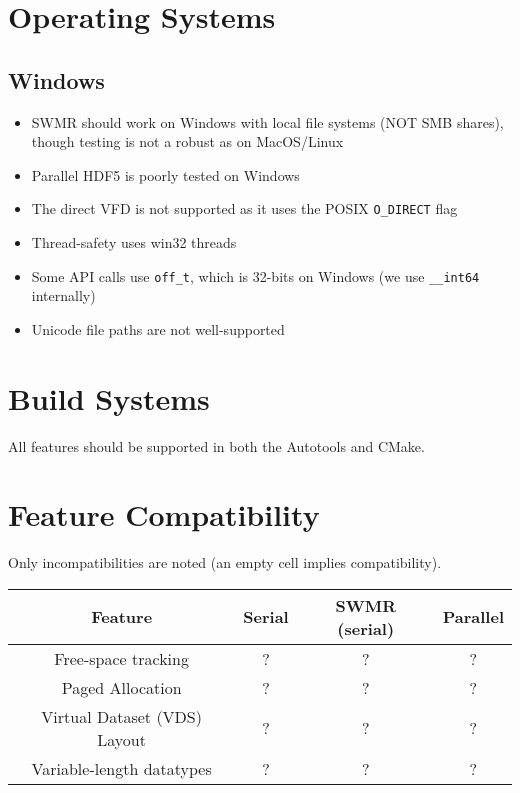 
\section{Operating Systems}

\subsection{Windows}
\begin{itemize}
    \item SWMR should work on Windows with local file systems (NOT SMB shares), though testing is not a robust as on MacOS/Linux
    \item Parallel HDF5 is poorly tested on Windows
    \item The direct VFD is not supported as it uses the POSIX \texttt{O\_DIRECT} flag
    \item Thread-safety uses win32 threads
    \item Some API calls use \texttt{off\_t}, which is 32-bits on Windows (we use \texttt{\_\_int64} internally)
    \item Unicode file paths are not well-supported
\end{itemize}

\section{Build Systems}

All features should be supported in both the Autotools and CMake.

\section{Feature Compatibility}

Only incompatibilities are noted (an empty cell implies compatibility).

\begin{minipage}{\textwidth}
  \begin{center}
    \begin{tabular}{|| c | c | c | c ||}
      \hline
      Feature & Serial & SWMR (serial) & Parallel \\
      \hline
      Free-space tracking & ? & ? & ?\\
      \hline
      Paged Allocation & ? & ? & ? \\
      \hline

      Virtual Dataset (VDS) Layout & ? & ? & ? \\
      \hline
      Variable-length datatypes & ? & ? & ? \\
      \hline
    \end{tabular}
  \end{center}
\end{minipage}

